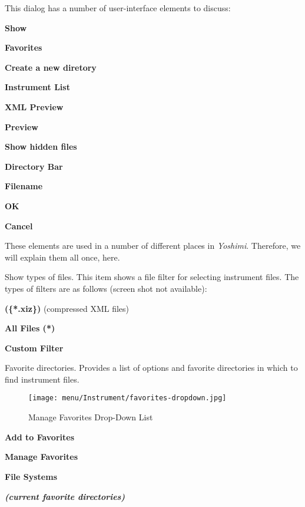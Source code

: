    This dialog has a number of user-interface elements to discuss:

   \begin{enumber}
      \item \textbf{Show}
      \item \textbf{Favorites}
      \item \textbf{Create a new diretory}
      \item \textbf{Instrument List}
      \item \textbf{XML Preview}
      \item \textbf{Preview}
      \item \textbf{Show hidden files}
      \item \textbf{Directory Bar}
      \item \textbf{Filename}
      \item \textbf{OK}
      \item \textbf{Cancel}
   \end{enumber}

   These elements are used in a number of different places in \textsl{Yoshimi}.
   Therefore, we will explain them all once, here.

   \setcounter{ItemCounter}{0}      %

   Show types of files.
   This item shows a file filter for selecting instrument files.
   The types of filters are as follows (screen shot not available):

   \begin{enumber}
      \item \textbf{(\{*.xiz\})} (compressed XML files)
      \item \textbf{All Files (*)}
      \item \textbf{Custom Filter}
   \end{enumber}

   Favorite directories.
   Provides a list of options and favorite directories in which to find 
   instrument files.

\begin{figure}[H]
   \centering 
   \texttt{[image: menu/Instrument/favorites-dropdown.jpg]}
   \caption{Manage Favorites Drop-Down List}
   \label{fig:open_instrument_favorites}
\end{figure}

   \begin{enumber}
      \item \textbf{Add to Favorites}
      \item \textbf{Manage Favorites}
      \item \textbf{File Systems}
      \item \textbf{\textsl{(current favorite directories)}}
   \end{enumber}

